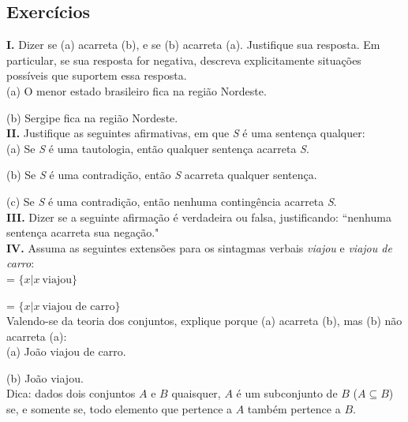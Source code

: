 \begin{tcolorbox}[boxrule=0pt,sharp corners,breakable]

\section*{Exercícios}


\n\textbf{I.} Dizer se (a) acarreta (b), e se (b) acarreta (a).
Justifique sua resposta. Em particular, se sua resposta for negativa,
 descreva explicitamente situa\-çõ\-es possíveis que suportem essa
resposta.\\

\n (a) O menor estado brasileiro fica na região Nordeste.

\n (b) Sergipe fica na região Nordeste.\\

\n\textbf{II.} Justifique as seguintes afirmativas, em que
\textit{S} é uma sentença qualquer:\\

\n (a) Se \textit{S} é uma tautologia, então qualquer sentença
acarreta \textit{S}.

\n (b) Se \textit{S} é uma contradi\-ção, então \textit{S}
acarreta qualquer sentença.

\n (c) Se \textit{S} é uma contradi\-ção, então nenhuma
contingência
acarreta \textit{S}.\\

\n\textbf{III.} Dizer se a seguinte afirma\-ção é verdadeira ou
falsa, justificando: ``nenhuma sentença acarreta sua nega\-ção."\\

\n\textbf{IV.} Assuma as seguintes extensões para os sintagmas
verbais \textit{viajou} e \textit{viajou de carro}:\\

\n {} = $\{x | x\ \text{viajou}\}$

\n {} = $\{x | x\ \text{viajou de
carro}\}$\\

\n Valendo-se da teoria dos conjuntos, explique porque (a)
acarreta (b), mas (b) não acarreta (a):\\

\n (a) João viajou de carro.

\n (b) João viajou.\\

\n Dica: dados dois conjuntos $A$ e $B$ quaisquer, $A$ é um subconjunto de $B$ ($A \subseteq B$) se, e somente se, todo elemento que pertence a $A$ também pertence a $B$. \\


\end{tcolorbox}
